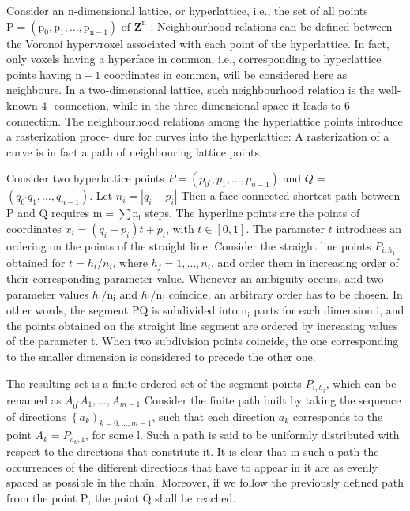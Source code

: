 \begin{CJK}{UTF8}{gbsn}
Consider an n-dimensional lattice, or hyperlattice, i.e., the set of all points $\mathrm{P}=\left(\mathrm{p}_{0}, \mathrm{p}_{1}, \ldots, \mathrm{p}_{\mathrm{n}-1}\right)$ of $\mathbf{Z}^{\mathrm{n}}$ : Neighbourhood relations can be defined between the Voronoi hypervroxel associated with each point of the hyperlattice. In fact, only voxels having a hyperface in common, i.e., corresponding to hyperlattice points having $\mathrm{n}-1$ coordinates in common, will be considered here as neighbours. In a two-dimensional lattice, such neighbourhood relation is the well-known 4 -connection, while in the three-dimensional space it leads to 6-connection. The neighbourhood relations among the hyperlattice points introduce a rasterization proce- dure for curves into the hyperlattice: A rasterization of a curve is in fact a path of neighbouring lattice points.

Consider two hyperlattice points $P=\left(p_{0^{\prime}}, p_{1}, \ldots, p_{n-1}\right)$ and $Q=$ $\left(q_{0^{\prime}} q_{1}, \ldots, q_{n-1}\right)$. Let $n_{i}=\left|q_{i}-p_{i}\right|$ Then a face-connected shortest path between $\mathrm{P}$ and $\mathrm{Q}$ requires $\mathrm{m}=\sum \mathrm{n}_{\mathrm{i}}$ steps. The hyperline points are the points of coordinates $x_{i}=\left(q_{i}-p_{i}\right) t+p_{i}$, with $t \in[0,1]$. The parameter $t$ introduces an ordering on the points of the straight line. Consider the straight line points $P_{i, h_{1}}$ obtained for $t=h_{i} / n_{i}$, where $h_{j}=1, \ldots, n_{i}$, and order them in increasing order of their corresponding parameter value. Whenever an ambiguity occurs, and two parameter values $h_{\mathrm{j}} / \mathrm{n}_{\mathrm{i}}$ and $h_{\mathrm{j}} / \mathrm{n}_{\mathrm{j}}$ coincide, an arbitrary order has to be chosen. In other words, the segment $\mathrm{PQ}$ is subdivided into $\mathrm{n}_{\mathrm{i}}$ parts for each dimension i, and the points obtained on the straight line segment are ordered by increasing values of the parameter t. When two subdivision points coincide, the one corresponding to the smaller dimension is considered to precede the other one.

The resulting set is a finite ordered set of the segment points $P_{i, h_{i}}$, which can be renamed as $A_{0^{\prime}} A_{1}, \ldots, A_{m-1}$ Consider the finite path built by taking the sequence of directions $\left\{a_{k}\right)_{k=0, \ldots, m-1}$, such that each direction $a_{k}$ corresponds to the point $A_{k}=P_{a_{k}, 1}$, for some l. Such a path is said to be uniformly distributed with respect to the directions that constitute it. It is clear that in such a path the occurrences of the different directions that have to appear in it are as evenly spaced as possible in the chain. Moreover, if we follow the previously defined path from the point $\mathrm{P}$, the point $\mathrm{Q}$ shall be reached.


\end{CJK}
